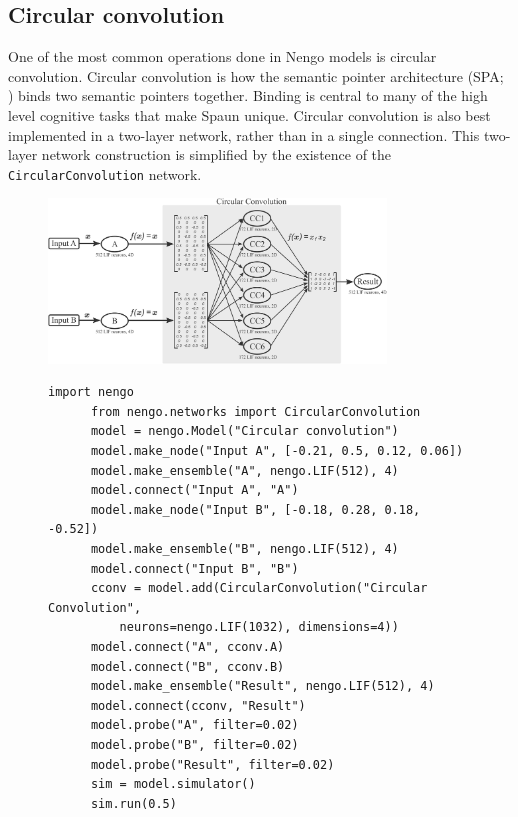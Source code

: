 \documentclass{frontiersSCNS}
\begin{document}
\subsection{Circular convolution}

One of the most common operations done
in Nengo models is circular convolution.
Circular convolution is how
the semantic pointer architecture
(SPA; \cite{TODO})
binds two semantic pointers together.
Binding is central to many
of the high level cognitive tasks
that make Spaun unique.
Circular convolution
is also best implemented in a two-layer network,
rather than in a single connection.
This two-layer network construction is simplified
by the existence of the \texttt{CircularConvolution} network.

\begin{figure}
\begin{center}
  \includegraphics[width=0.8\textwidth]{cconv}
  \begin{minipage}{0.53\textwidth}
    \begin{lstlisting}[basicstyle={\footnotesize\ttfamily}]
      import nengo
      from nengo.networks import CircularConvolution
      model = nengo.Model("Circular convolution")
      model.make_node("Input A", [-0.21, 0.5, 0.12, 0.06])
      model.make_ensemble("A", nengo.LIF(512), 4)
      model.connect("Input A", "A")
      model.make_node("Input B", [-0.18, 0.28, 0.18, -0.52])
      model.make_ensemble("B", nengo.LIF(512), 4)
      model.connect("Input B", "B")
      cconv = model.add(CircularConvolution("Circular Convolution",
          neurons=nengo.LIF(1032), dimensions=4))
      model.connect("A", cconv.A)
      model.connect("B", cconv.B)
      model.make_ensemble("Result", nengo.LIF(512), 4)
      model.connect(cconv, "Result")
      model.probe("A", filter=0.02)
      model.probe("B", filter=0.02)
      model.probe("Result", filter=0.02)
      sim = model.simulator()
      sim.run(0.5)
    \end{lstlisting}
  \end{minipage}

\end{center}
\end{figure}
\end{document}

